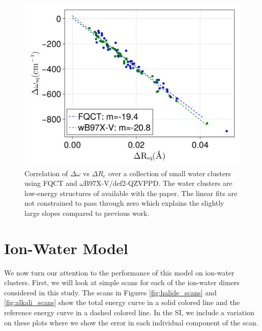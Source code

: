 \documentclass[journal=jctcce,manuscript=article]{achemso}
\begin{document}
\begin{figure}[h]
  \includegraphics*[width=\textwidth]{figures/badger_correlation_final.png}
  \caption{Correlation of $\Delta\omega$ vs $\Delta R_e$ over a collection
  of small water clusters using FQCT and $\omega$B97X-V/def2-QZVPPD.
  The water clusters are low-energy structures of  available
  with the paper. The linear fits are not constrained to pass through zero
  which explains the slightly large slopes compared to previous work.\cite{boyer2019beyond}
}
  \label{fig:badger2}
\end{figure}

\section*{Ion-Water Model}

We now turn our attention to the performance of this model on ion-water clusters. First, we will look at simple scans for each of the ion-water dimers considered in this study. The scans in Figures \ref{fig:halide_scans} and \ref{fig:alkali_scans} show the total energy curve in a solid colored line and the reference energy curve in a dashed colored line. In the SI, we include a variation on these plots where we show the error in each individual component of the scan.
\end{document}
